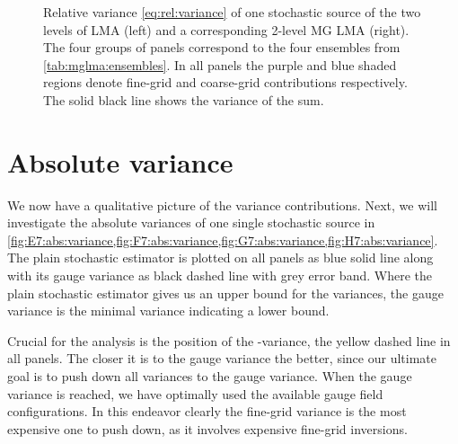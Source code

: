 \begin{figure}
\centering

\hfill
{}

\hfill
{}

\caption{Relative variance \cref{eq:rel:variance} of one stochastic source of the two levels of LMA (left) and a corresponding 2-level MG LMA (right). The four groups of panels correspond to the four ensembles from \cref{tab:mglma:ensembles}. In all panels the purple and blue shaded regions denote fine-grid and coarse-grid contributions respectively. The solid black line shows the variance of the sum.}
\label{fig:rel:variance}
\end{figure}

\section{Absolute variance}

We now have a qualitative picture of the variance contributions.
Next, we will investigate the absolute variances of one single stochastic source in \cref{fig:E7:abs:variance,fig:F7:abs:variance,fig:G7:abs:variance,fig:H7:abs:variance}.
The plain stochastic estimator is plotted on all panels as blue solid line along with its gauge variance as black dashed line with grey error band.
Where the plain stochastic estimator gives us an upper bound for the variances, the gauge variance is the minimal variance indicating a lower bound.

Crucial for the analysis is the position of the -variance, the yellow dashed line in all panels.
The closer it is to the gauge variance the better, since our ultimate goal is to push down all variances to the gauge variance.
When the gauge variance is reached, we have optimally used the available gauge field configurations.
In this endeavor clearly the fine-grid variance is the most expensive one to push down, as it involves expensive fine-grid inversions.

